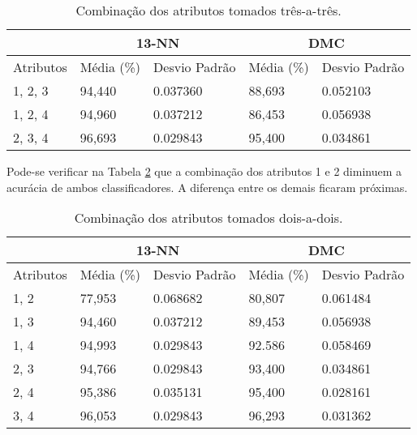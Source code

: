 \documentclass{article}
\begin{document}
\begin{table}[!h]
	\centering
	\vspace{0.5cm}
\begin{tabular}{l|l|l|l|l|}
\cline{2-5}
                                & \multicolumn{2}{c|}{13-NN} & \multicolumn{2}{c|}{DMC}   \\ \hline
\multicolumn{1}{|l|}{Atributos} & Média (\%) & Desvio Padrão & Média (\%) & Desvio Padrão \\ \hline
\multicolumn{1}{|l|}{1, 2, 3} & 94,440 & \num{0,037360} & 88,693 & \num{0,052103}       \\ \hline
\multicolumn{1}{|l|}{1, 2, 4} & 94,960 & \num{0,037212} & 86,453 & \num{0,056938}       \\ \hline
\multicolumn{1}{|l|}{2, 3, 4} & 96,693 & \num{0,029843} & 95,400 & \num{0,034861}       \\ \hline
\end{tabular}
\caption{Combinação dos atributos tomados três-a-três.}\label{tab:combinacao_3}
\end{table}

Pode-se verificar na Tabela \ref{tab:combinacao_2} que a combinação dos atributos 1 e 2 diminuem a acurácia de ambos classificadores. A diferença entre os demais ficaram próximas.

\begin{table}[!h]
	\centering
	\vspace{0.5cm}
\begin{tabular}{l|l|l|l|l|}
\cline{2-5}
                                & \multicolumn{2}{c|}{13-NN} & \multicolumn{2}{c|}{DMC}   \\ \hline
\multicolumn{1}{|l|}{Atributos} & Média (\%) & Desvio Padrão & Média (\%) & Desvio Padrão \\ \hline
\multicolumn{1}{|l|}{1, 2} & 77,953 & \num{0,068682} & 80,807 & \num{0,061484}       \\ \hline
\multicolumn{1}{|l|}{1, 3} & 94,460 & \num{0,037212} & 89,453 & \num{0,056938}       \\ \hline
\multicolumn{1}{|l|}{1, 4} & 94,993 & \num{0,029843} & 92.586 & \num{0.058469}       \\ \hline
\multicolumn{1}{|l|}{2, 3} & 94,766 & \num{0,029843} & 93,400 & \num{0,034861}       \\ \hline
\multicolumn{1}{|l|}{2, 4} & 95,386 & \num{0,035131} & 95,400 & \num{0,028161}       \\ \hline
\multicolumn{1}{|l|}{3, 4} & 96,053 & \num{0,029843} & 96,293 & \num{0,031362}       \\ \hline

\end{tabular}
\caption{Combinação dos atributos tomados dois-a-dois.}\label{tab:combinacao_2}
\end{table}
\end{document}
